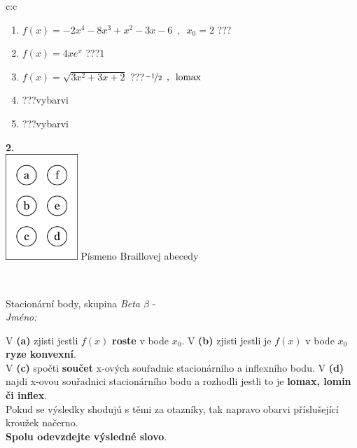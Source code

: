 \documentclass[10pt]{report}
\begin{document}
\begin{tabular}{c:c}
\begin{minipage}[c][104.5mm][t]{0.5\linewidth}
\begin{center}
\begin{minipage}{0.79\linewidth}
\begin{center}
\begin{varwidth}{\linewidth}
\begin{enumerate}
\item $f(x)=-2x^4-8x^3+x^2-3x-6\enspace , \enspace x_0=2$\quad \dotfill\; ???\;\dotfill \quad {}
\item $f(x)=4xe^{x}$\quad \dotfill\; ???\;\dotfill \quad $1$
\item $f(x)=\sqrt{3x^2+3x+2}$\quad \dotfill\; ???\;\dotfill \quad $\nicefrac{-1}{2}\enspace , \enspace\mathrm{lomax}$
\item \quad \dotfill\; ???\;\dotfill \quad vybarvi
\item \quad \dotfill\; ???\;\dotfill \quad vybarvi
\end{enumerate}
\end{varwidth}
\end{center}
\end{minipage}
\begin{minipage}{0.20\linewidth}
\begin{center}
{\Huge\bfseries 2.} \\[2mm]
\includegraphics[height=40mm]{../images/braille.png}
{\small Písmeno Braillovej abecedy}
\end{center}
\end{minipage}
\end{center}
\end{minipage}
\\ \hdashline
\begin{minipage}[c][104.5mm][t]{0.5\linewidth}
\begin{center}
\vspace{7mm}
{\huge Stacionární body, skupina \textit{Beta $\beta$} -}\\[5mm]
\textit{Jméno:}\phantom{xxxxxxxxxxxxxxxxxxxxxxxxxxxxxxxxxxxxxxxxxxxxxxxxxxxxxxxxxxxxxxxxx}\\[5mm]
\begin{minipage}{0.95\linewidth}
\begin{center}
{\small V \textbf{(a)} zjisti jestli $f(x)$ \textbf{roste} v bode $x_0$. V \textbf{(b)} zjisti jestli je $f(x)$ v bode $x_0$ \textbf{ryze konvexní}.\\V \textbf{(c)} spočti \textbf{součet} x-ových souřadnic stacionárního a inflexního bodu. V \textbf{(d)} najdi x-ovou souřadnici stacionárního bodu a rozhodli jestli to je \textbf{lomax, lomin či inflex}.\\Pokud se výsledky shodujú s těmi za otazníky, tak napravo obarvi příslušející kroužek načerno.\\\textbf{Spolu odevzdejte výsledné slovo}}.

\end{center}
\end{minipage}
\end{center}
\end{minipage}
\end{tabular}
\end{document}
